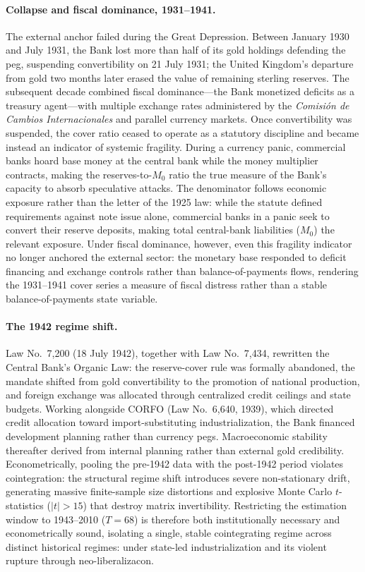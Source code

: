 \paragraph{Collapse and fiscal dominance, 1931--1941.}
The external anchor failed during the Great Depression. Between January 1930 and July 1931, the Bank lost more than half of its gold holdings defending the peg, suspending convertibility on 21 July 1931; the United Kingdom's departure from gold two months later erased the value of remaining sterling reserves. The subsequent decade combined fiscal dominance---the Bank monetized deficits as a treasury agent---with multiple exchange rates administered by the \textit{Comisión de Cambios Internacionales} and parallel currency markets. Once convertibility was suspended, the cover ratio ceased to operate as a statutory discipline and became instead an indicator of systemic fragility. During a currency panic, commercial banks hoard base money at the central bank while the money multiplier contracts, making the reserves-to-$M_0$ ratio the true measure of the Bank's capacity to absorb speculative attacks. The denominator follows economic exposure rather than the letter of the 1925 law: while the statute defined requirements against note issue alone, commercial banks in a panic seek to convert their reserve deposits, making total central-bank liabilities ($M_0$) the relevant exposure. Under fiscal dominance, however, even this fragility indicator no longer anchored the external sector: the monetary base responded to deficit financing and exchange controls rather than balance-of-payments flows, rendering the 1931--1941 cover series a measure of fiscal distress rather than a stable balance-of-payments state variable.

\paragraph{The 1942 regime shift.}
Law No.~7,200 (18 July 1942), together with Law No.~7,434, rewritten the Central Bank's Organic Law: the reserve-cover rule was formally abandoned, the mandate shifted from gold convertibility to the promotion of national production, and foreign exchange was allocated through centralized credit ceilings and state budgets. Working alongside CORFO (Law No.~6,640, 1939), which directed credit allocation toward import-substituting industrialization, the Bank financed development planning rather than currency pegs. Macroeconomic stability thereafter derived from internal planning rather than external gold credibility. Econometrically, pooling the pre-1942 data with the post-1942 period violates cointegration: the structural regime shift introduces severe non-stationary drift, generating massive finite-sample size distortions and explosive Monte Carlo $t$-statistics ($|t| > 15$) that destroy matrix invertibility. Restricting the estimation window to 1943--2010 ($T = 68$) is therefore both institutionally necessary and econometrically sound, isolating a single, stable cointegrating regime across distinct historical regimes: under state-led industrialization and its violent rupture through neo-liberalizacon. 

